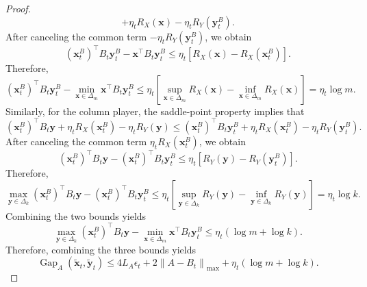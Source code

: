 \documentclass[12pt]{article}
\begin{document}
\begin{proof}
\begin{equation*}
+ \eta_t R_X(\bm x)
- \eta_t R_Y(\bm y_t^B).
\end{equation*}
After canceling the common term $-\eta_tR_Y(\bm y_t^B)$, we obtain
\[
(\bm x_t^B)^\top B_t\bm y_t^B
-
\bm x^\top B_t\bm y_t^B
\le
\eta_t
\left[
R_X(\bm x)-R_X(\bm x_t^B)
\right].
\]
Therefore,
\begin{equation*}
(\bm x_t^B)^\top B_t\bm y_t^B
-
\min_{\bm x\in\Delta_m}
\bm x^\top B_t\bm y_t^B \le
\eta_t
\left[
\sup_{\bm x\in\Delta_m}R_X(\bm x)
-
\inf_{\bm x\in\Delta_m}R_X(\bm x)
\right]
= \eta_t\log m.
\end{equation*}
Similarly, for the column player, the saddle-point property implies that
\begin{equation*}
(\bm x_t^B)^\top B_t\bm y
+
\eta_t R_X(\bm x_t^B)
-
\eta_t R_Y(\bm y)
\le
(\bm x_t^B)^\top B_t\bm y_t^B
+
\eta_t R_X(\bm x_t^B)
-
\eta_t R_Y(\bm y_t^B).
\end{equation*}
After canceling the common term $\eta_tR_X(\bm x_t^B)$, we obtain
\[
(\bm x_t^B)^\top B_t\bm y
-
(\bm x_t^B)^\top B_t\bm y_t^B
\le
\eta_t
\left[
R_Y(\bm y)-R_Y(\bm y_t^B)
\right].
\]
Therefore,
\begin{equation*}
\max_{\bm y\in\Delta_k}
(\bm x_t^B)^\top B_t\bm y
-
(\bm x_t^B)^\top B_t\bm y_t^B
\le
\eta_t
\left[
\sup_{\bm y\in\Delta_k}R_Y(\bm y)
-
\inf_{\bm y\in\Delta_k}R_Y(\bm y)
\right]
= \eta_t\log k.
\end{equation*}
Combining the two bounds yields
\begin{equation*}
\max_{\bm y\in\Delta_k}
(\bm x_t^B)^\top B_t\bm y
-
\min_{\bm x\in\Delta_m}
\bm x^\top B_t\bm y_t^B
\le \eta_t(\log m+\log k).
\end{equation*}
Therefore, combining the three bounds yields
\begin{equation}
\label{equ:single-step-gap-bound}
\operatorname{Gap}_A
\left(
\widetilde{\bm x}_t,\widetilde{\bm y}_t
\right)
\le
4L_A\epsilon_t
+
2\left\|A-B_t\right\|_{\max}
+
\eta_t(\log m+\log k).
\end{equation}


\end{proof}
\end{document}
